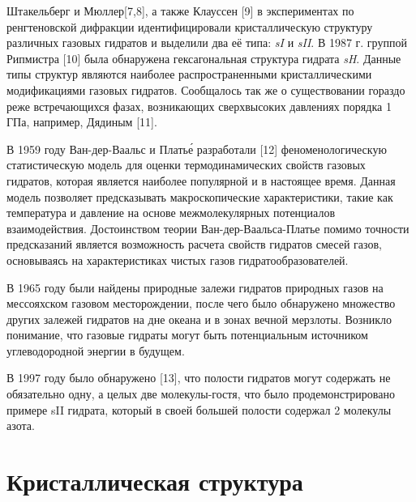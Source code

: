 \par Штакельберг и Мюллер[7,8], а также Клауссен [9] в экспериментах по ренгтеновской дифракции идентифицировали кристаллическую структуру различных газовых гидратов и выделили два её типа: \textit{sI} и \textit{sII}. В 1987 г. группой Рипмистра [10] была обнаружена гексагональная структура гидрата \textit{sH}. Данные типы структур являются наиболее распространенными кристаллическими модификациями газовых гидратов. Сообщалось так же о существовании гораздо реже встречающихся фазах, возникающих сверхвысоких давлениях порядка 1 ГПа, например, Дядиным [11].

\par В 1959 году Ван-дер-Ваальс и Плать\'е разработали [12]  феноменологическую статистическую модель для оценки термодинамических свойств газовых гидратов, которая является наиболее популярной и в настоящее время. Данная модель позволяет предсказывать макроскопические характеристики, такие как температура и давление на основе межмолекулярных потенциалов взаимодействия. Достоинством теории Ван-дер-Ваальса-Платье помимо точности предсказаний является возможность расчета свойств гидратов смесей газов, основываясь на характеристиках чистых газов гидратообразователей.


\par В 1965 году были найдены природные залежи гидратов природных газов на мессояхском газовом месторождении, после чего было обнаружено множество других залежей гидратов на дне океана и в зонах вечной мерзлоты. Возникло понимание, что газовые гидраты могут быть потенциальным источником углеводородной энергии в будущем.
    
\par В 1997 году было обнаружено [13], что полости гидратов могут содержать не обязательно одну, а целых две молекулы-гостя, что было продемонстрировано примере sII гидрата, который в своей большей полости содержал 2 молекулы азота.

\section{Кристаллическая структура}

